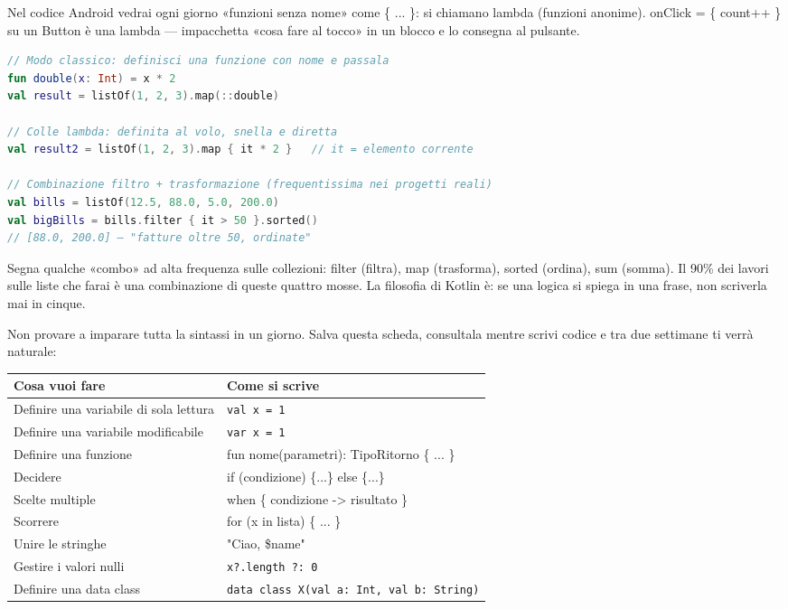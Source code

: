 
Nel codice Android vedrai ogni giorno «funzioni senza nome» come \{ ... \}: si chiamano lambda (funzioni anonime). onClick = \{ count++ \} su un Button è una lambda — impacchetta «cosa fare al tocco» in un blocco e lo consegna al pulsante.

\begin{lstlisting}[language=Kotlin]
// Modo classico: definisci una funzione con nome e passala
fun double(x: Int) = x * 2
val result = listOf(1, 2, 3).map(::double)

// Colle lambda: definita al volo, snella e diretta
val result2 = listOf(1, 2, 3).map { it * 2 }   // it = elemento corrente

// Combinazione filtro + trasformazione (frequentissima nei progetti reali)
val bills = listOf(12.5, 88.0, 5.0, 200.0)
val bigBills = bills.filter { it > 50 }.sorted()
// [88.0, 200.0] — "fatture oltre 50, ordinate"
\end{lstlisting}

Segna qualche «combo» ad alta frequenza sulle collezioni: filter (filtra), map (trasforma), sorted (ordina), sum (somma). Il 90\% dei lavori sulle liste che farai è una combinazione di queste quattro mosse. La filosofia di Kotlin è: se una logica si spiega in una frase, non scriverla mai in cinque.


Non provare a imparare tutta la sintassi in un giorno. Salva questa scheda, consultala mentre scrivi codice e tra due settimane ti verrà naturale:

\begin{center}
\begin{tabularx}{\linewidth}{|X|X|}
\hline
\textbf{Cosa vuoi fare} & \textbf{Come si scrive} \tabularnewline
\hline
Definire una variabile di sola lettura & \texttt{val x = 1} \tabularnewline
Definire una variabile modificabile & \texttt{var x = 1} \tabularnewline
Definire una funzione & fun nome(parametri): TipoRitorno \{ ... \} \tabularnewline
Decidere & if (condizione) \{...\} else \{...\} \tabularnewline
Scelte multiple & when \{ condizione -> risultato \} \tabularnewline
Scorrere & for (x in lista) \{ ... \} \tabularnewline
Unire le stringhe & "Ciao, \$name" \tabularnewline
Gestire i valori nulli & \texttt{x?.\allowbreak length ?: 0} \tabularnewline
Definire una data class & \texttt{data class X(val a: Int, val b: String)} \tabularnewline
\hline
\end{tabularx}
\end{center}

